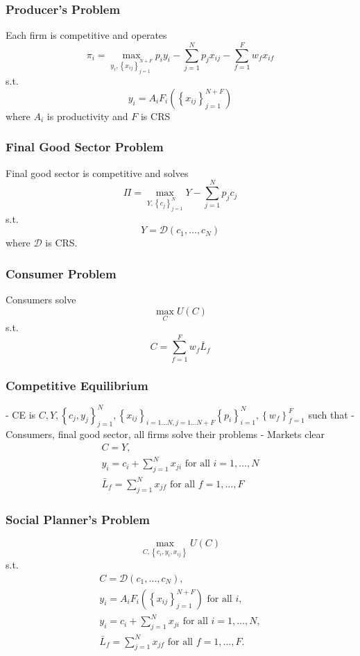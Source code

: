 \documentclass[10pt]{article}
\begin{document}
\subsubsection{Producer's Problem}

Each firm is competitive and operates
$$
\pi_i=\max _{y_i,\left\{x_{i j}\right\}_{j=1}^{N+F}} p_i y_i-\sum_{j=1}^N p_j x_{i j}-\sum_{f=1}^F w_f x_{i f}
$$
s.t.
$$
y_i=A_i F_i\left(\left\{x_{i j}\right\}_{j=1}^{N+F}\right)
$$
where $A_i$ is productivity and $F$ is CRS

\subsubsection{Final Good Sector Problem}

Final good sector is competitive and solves
$$
\Pi=\max _{Y,\left\{c_j\right\}_{j=1}^N} Y-\sum_{j=1}^N p_j c_j
$$
s.t.
$$
Y=\mathcal{D}\left(c_1, \ldots, c_N\right)
$$
where $\mathcal{D}$ is CRS.

\subsubsection{Consumer Problem}

Consumers solve
$$
\max _C U(C)
$$
s.t.
$$
C=\sum_{f=1}^F w_f \bar{L}_f
$$

\subsubsection{Competitive Equilibrium}

- CE is $C, Y,\left\{c_j, y_j\right\}_{j=1}^N,\left\{x_{i j}\right\}_{i=1 \ldots N, j=1 \ldots N+F}\left\{p_i\right\}_{i=1}^N,\left\{w_f\right\}_{f=1}^F$ such that
- Consumers, final good sector, all firms solve their problems
- Markets clear
$$
\begin{gathered}
C=Y, \\
y_i=c_i+\sum_{j=1}^N x_{j i} \text { for all } i=1, \ldots, N \\
\bar{L}_f=\sum_{j=1}^N x_{j f} \text { for all } f=1, \ldots, F
\end{gathered}
$$

\subsubsection{Social Planner's Problem}

$$
\max _{C,\left\{c_i, y_i, x_{i j}\right\}} U(C)
$$
s.t.
$$
\begin{gathered}
C=\mathcal{D}\left(c_1, \ldots, c_N\right), \\
y_i=A_i F_i\left(\left\{x_{i j}\right\}_{j=1}^{N+F}\right) \text { for all } i, \\
y_i=c_i+\sum_{j=1}^N x_{j i} \text { for all } i=1, \ldots, N, \\
\bar{L}_f=\sum_{j=1}^N x_{j f} \text { for all } f=1, \ldots, F .
\end{gathered}
$$
\end{document}
